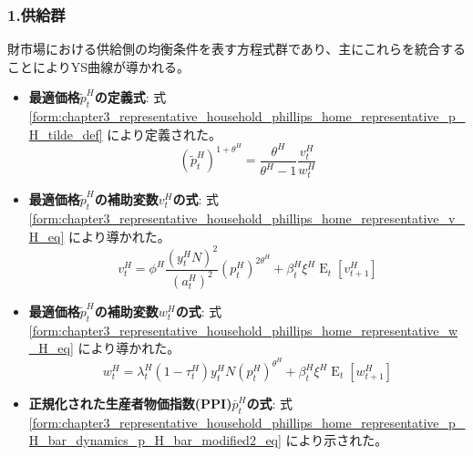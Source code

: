 \subsubsection*{1.供給群}
\label{sec:chapter5_two_plane_classification_supply}
財市場における供給側の均衡条件を表す方程式群であり、主にこれらを統合することによりYS曲線が導かれる。
\begin{itemize}
    \item
    \label{itm:chapter5_two_plane_classification_supply_p_H_tilde}
        \textbf{最適価格\(\widetilde{p}_t^H\)の定義式}:
        式
        \eqref{form:chapter3_representative_household_phillips_home_representative_p_H_tilde_def}
        により定義された。
        \begin{equation}
        \label{form:chapter5_two_plane_classification_supply_p_H_tilde_def}
            (\widetilde{p}_t^H)^{1+\theta^H}=\frac{\theta^H}{\theta^H-1}\frac{v_t^H}{w_t^H}
        \end{equation}
    \item
    \label{itm:chapter5_two_plane_classification_supply_v_H}
        \textbf{最適価格\(\widetilde{p}_t^H\)の補助変数\(v_t^H\)の式}:
        式
        \eqref{form:chapter3_representative_household_phillips_home_representative_v_H_eq}
        により導かれた。
        \begin{equation}
        \label{form:chapter5_two_plane_classification_supply_v_H_eq}
            v_t^H=\phi^H\frac{(y_t^H N)^2}{(a_t^H)^2}(p_t^H)^{2\theta^H}+\beta_t^H\xi^H\operatorname{E}_t[v_{t+1}^H]
        \end{equation}
    \item
    \label{itm:chapter5_two_plane_classification_supply_w_H}
        \textbf{最適価格\(\widetilde{p}_t^H\)の補助変数\(w_t^H\)の式}:
        式
        \eqref{form:chapter3_representative_household_phillips_home_representative_w_H_eq}
        により導かれた。
        \begin{equation}
        \label{form:chapter5_two_plane_classification_supply_w_H_eq}
            w_t^H=\lambda_t^H(1-\tau_t^H)y_t^H N(p_t^H)^{\theta^H}+\beta_t^H\xi^H\operatorname{E}_t[w_{t+1}^H]
        \end{equation}
    \item
    \label{itm:chapter5_two_plane_classification_supply_p_H_bar}
        \textbf{正規化された生産者物価指数(PPI)\(\bar{p}_t^H\)の式}:
        式
        \eqref{form:chapter3_representative_household_phillips_home_representative_p_H_bar_dynamics_p_H_bar_modified2_eq}
        により示された。
        \begin{equation}

\end{equation}
\end{itemize}
